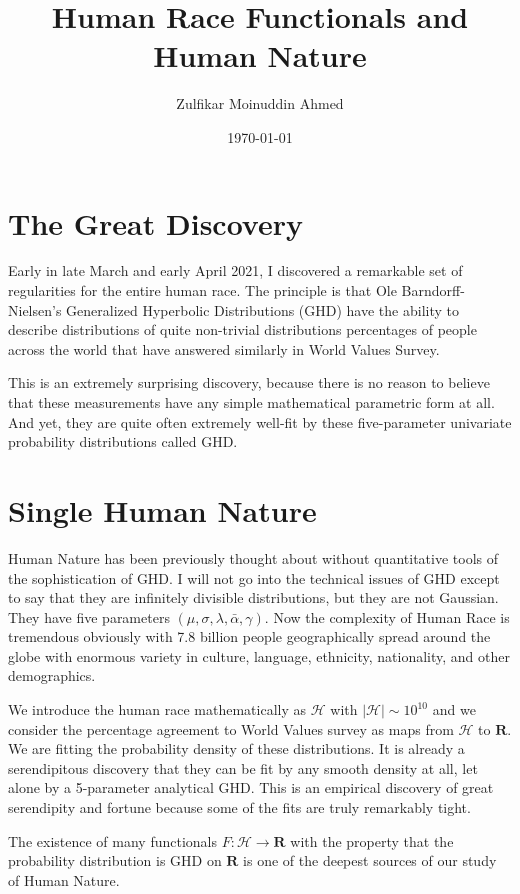 \documentclass{amsart}
\title{Human Race Functionals and Human Nature}
\author{Zulfikar Moinuddin Ahmed}
\date{\today}
\begin{document}
\maketitle

\section{The Great Discovery}

Early in late March and early April 2021, I discovered a remarkable set of regularities for the entire human race.  The principle is that Ole Barndorff-Nielsen's Generalized Hyperbolic Distributions (GHD) have the ability to describe distributions of quite non-trivial distributions percentages of people across the world that have answered similarly in World Values Survey.  

This is an extremely surprising discovery, because there is no reason to believe that these measurements have any simple mathematical parametric form at all.  And yet, they are quite often extremely well-fit by these five-parameter univariate probability distributions called GHD.

\section{Single Human Nature}

Human Nature has been previously thought about without quantitative tools of the sophistication of GHD.  I will not go into the technical issues of GHD except to say that they are infinitely divisible distributions, but they are not Gaussian.  They have five parameters $(\mu,\sigma, \lambda,\bar{\alpha},\gamma)$.  Now the complexity of Human Race is tremendous obviously with 7.8 billion people geographically spread around the globe with enormous variety in culture, language, ethnicity, nationality, and other demographics.

We introduce the human race mathematically as $\mathcal{H}$ with $|\mathcal{H}| \sim 10^{10}$ and we consider the percentage agreement to World Values survey as maps from $\mathcal{H}$ to $\mathbf{R}$.  We are fitting the probability density of these distributions.  It is already a serendipitous discovery that they can be fit by any smooth density at all, let alone by a 5-parameter analytical GHD.  This is an empirical discovery of great serendipity and fortune because some of the fits are truly remarkably tight.

The existence of many functionals $F:\mathcal{H}\rightarrow\mathbf{R}$ with the property that the probability distribution is GHD on $\mathbf{R}$ is one of the deepest sources of our study of Human Nature.  
\end{document}
